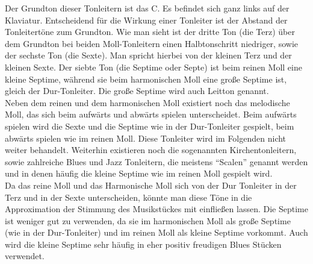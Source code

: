 \documentclass[11pt,a4paper]{article}
\begin{document}
Der Grundton dieser Tonleitern ist das C. Es befindet sich ganz links auf der Klaviatur. Entscheidend für die Wirkung einer Tonleiter ist der Abstand der Tonleitertöne zum Grundton. Wie man sieht ist der dritte Ton (die Terz) über dem Grundton bei beiden Moll-Tonleitern einen Halbtonschritt niedriger, sowie der sechste Ton (die Sexte). Man spricht hierbei von der kleinen Terz und der kleinen Sexte. Der siebte Ton (die Septime oder Septe) ist beim reinen Moll eine kleine Septime, während sie beim harmonischen Moll eine große Septime ist, gleich der Dur-Tonleiter. Die große Septime wird auch Leitton genannt.\\
Neben dem reinen und dem harmonischen Moll existiert noch das melodische Moll, das sich beim aufwärts und abwärts spielen unterscheidet. Beim aufwärts spielen wird die Sexte und die Septime wie in der Dur-Tonleiter gespielt, beim abwärts spielen wie im reinen Moll. Diese Tonleiter wird im Folgenden nicht weiter behandelt. Weiterhin existieren noch die sogenannten Kirchentonleitern, sowie zahlreiche Blues und Jazz Tonleitern, die meistens ``Scalen'' genannt werden und in denen häufig die kleine Septime wie im reinen Moll gespielt wird.\\
Da das reine Moll und das Harmonische Moll sich von der Dur Tonleiter in der Terz und in der Sexte unterscheiden, könnte man diese Töne in die Approximation der Stimmung des Musikstückes mit einfließen lassen. Die Septime ist weniger gut zu verwenden, da sie im harmonischen Moll als große Septime (wie in der Dur-Tonleiter) und im reinen Moll als kleine Septime vorkommt. Auch wird die kleine Septime sehr häufig in eher positiv freudigen Blues Stücken verwendet.

\end{document}
